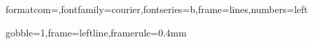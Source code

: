 %
%
%
%


%	
%	
%	
%	
%	






{formatcom=\color{blue},fontfamily=courier,fontseries=b,frame=lines,numbers=left}

{gobble=1,frame=leftline,framerule=0.4mm}



\newcommand{\wifi}{IEEE 802.11\xspace}

\renewcommand{\rmdefault}{phv}
\renewcommand{\sfdefault}{phv}

\setlength{\parskip}{10pt plus 1pt minus 1pt}

